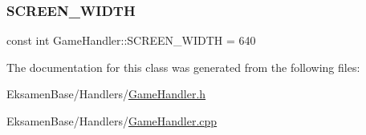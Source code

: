 \mbox{\label{class_game_handler_a9ae6b1b8478a4bc1928f07d5e52d0b95}} 
\subsubsection{\texorpdfstring{S\+C\+R\+E\+E\+N\+\_\+\+W\+I\+D\+TH}{SCREEN\_WIDTH}}
{\footnotesize\ttfamily const int Game\+Handler\+::\+S\+C\+R\+E\+E\+N\+\_\+\+W\+I\+D\+TH = 640\hspace{0.3cm}{\ttfamily [static]}}



The documentation for this class was generated from the following files\+:\begin{DoxyCompactItemize}
\item 
Eksamen\+Base/\+Handlers/\mbox{\hyperlink{_game_handler_8h}{Game\+Handler.\+h}}\item 
Eksamen\+Base/\+Handlers/\mbox{\hyperlink{_game_handler_8cpp}{Game\+Handler.\+cpp}}\end{DoxyCompactItemize}
